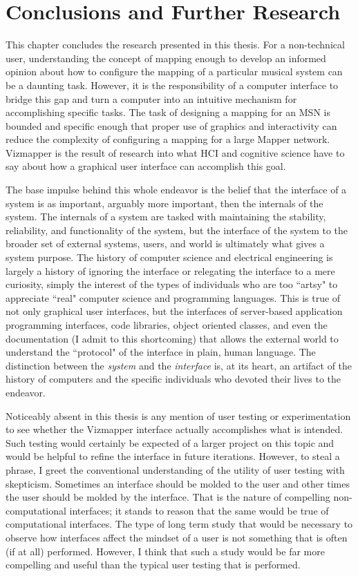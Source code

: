\resetdatestamp

\chapter{Conclusions and Further Research}

This chapter concludes the research presented in this thesis. For a non-technical user, understanding the concept of mapping enough to develop an informed opinion about how to configure the mapping of a particular musical system can be a daunting task. However, it is the responsibility of a computer interface to bridge this gap and turn a computer into an intuitive mechanism for accomplishing specific tasks. The task of designing a mapping for an MSN is bounded and specific enough that proper use of graphics and interactivity can reduce the complexity of configuring a mapping for a large Mapper network. Vizmapper is the result of research into what HCI and cognitive science have to say about how a graphical user interface can accomplish this goal.

The base impulse behind this whole endeavor is the belief that the interface of a system is as important, arguably more important, then the internals of the system. The internals of a system are tasked with maintaining the stability, reliability, and functionality of the system, but the interface of the system to the broader set of external systems, users, and world is ultimately what gives a system purpose. The history of computer science and electrical engineering is largely a history of ignoring the interface or relegating the interface to a mere curiosity, simply the interest of the types of individuals who are too ``artsy" to appreciate ``real" computer science and programming languages. This is true of not only graphical user interfaces, but the interfaces of server-based application programming interfaces, code libraries, object oriented classes, and even the documentation (I admit to this shortcoming) that allows the external world to understand the ``protocol" of the interface in plain, human language. The distinction between the \emph{system} and the \emph{interface} is, at its heart, an artifact of the history of computers and the specific individuals who devoted their lives to the endeavor.

Noticeably absent in this thesis is any mention of user testing or experimentation to see whether the Vizmapper interface actually accomplishes what is intended. Such testing would certainly be expected of a larger project on this topic and would be helpful to refine the interface in future iterations. However, to steal a phrase, I greet the conventional understanding of the utility of user testing with skepticism. Sometimes an interface should be molded to the user and other times the user should be molded by the interface. That is the nature of compelling non-computational interfaces; it stands to reason that the same would be true of computational interfaces. The type of long term study that would be necessary to observe how interfaces affect the mindset of a user is not something that is often (if at all) performed. However, I think that such a study would be far more compelling and useful than the typical user testing that is performed.

